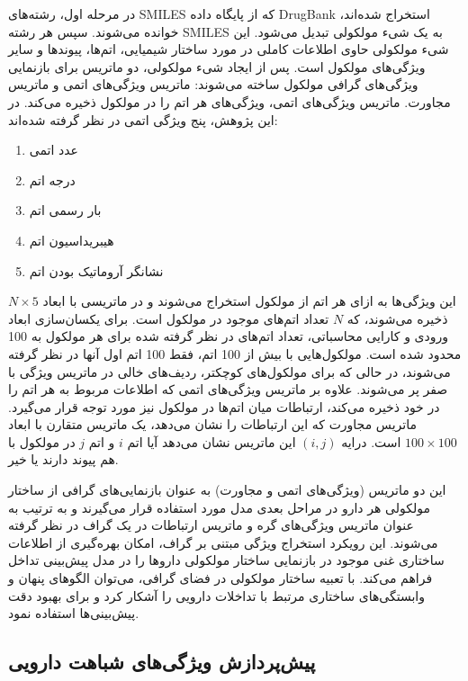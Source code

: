 در مرحله اول، رشته‌های SMILES که از پایگاه داده DrugBank استخراج شده‌اند، خوانده می‌شوند. سپس هر رشته SMILES به یک شیء مولکولی تبدیل می‌شود. این شیء مولکولی حاوی اطلاعات کاملی در مورد ساختار شیمیایی، اتم‌ها، پیوندها و سایر ویژگی‌های مولکول است. پس از ایجاد شیء مولکولی، دو ماتریس برای بازنمایی ویژگی‌های گرافی مولکول ساخته می‌شوند: ماتریس ویژگی‌های اتمی و ماتریس مجاورت. ماتریس ویژگی‌های اتمی، ویژگی‌های هر اتم را در مولکول ذخیره می‌کند. در این پژوهش، پنج ویژگی اتمی در نظر گرفته شده‌اند:

\begin{enumerate}
	\item عدد اتمی
	\item درجه اتم 
	\item بار رسمی اتم
	\item هیبریداسیون اتم
	\item نشانگر آروماتیک بودن اتم
\end{enumerate}

این ویژگی‌ها به ازای هر اتم از مولکول استخراج می‌شوند و در ماتریسی با ابعاد $N \times 5$ ذخیره می‌شوند، که $N$ تعداد اتم‌های موجود در مولکول است. برای یکسان‌سازی ابعاد ورودی و کارایی محاسباتی، تعداد اتم‌های در نظر گرفته شده برای هر مولکول به 100 محدود شده است. مولکول‌هایی با بیش از 100 اتم، فقط 100 اتم اول آنها در نظر گرفته می‌شوند، در حالی که برای مولکول‌های کوچکتر، ردیف‌های خالی در ماتریس ویژگی با صفر پر می‌شوند. علاوه بر ماتریس ویژگی‌های اتمی که اطلاعات مربوط به هر اتم را در خود ذخیره می‌کند، ارتباطات میان اتم‌ها در مولکول نیز مورد توجه قرار می‌گیرد. ماتریس مجاورت که این ارتباطات را نشان می‌دهد، یک ماتریس متقارن با ابعاد $100 \times 100$ است. درایه $(i,j)$ این ماتریس نشان می‌دهد آیا اتم $i$ و اتم $j$ در مولکول با هم پیوند دارند یا خیر.

این دو ماتریس (ویژگی‌های اتمی و مجاورت) به عنوان بازنمایی‌های گرافی از ساختار مولکولی هر دارو در مراحل بعدی مدل مورد استفاده قرار می‌گیرند و به ترتیب به عنوان ماتریس ویژگی‌های گره و ماتریس ارتباطات در یک گراف در نظر گرفته می‌شوند. این رویکرد استخراج ویژگی مبتنی بر گراف، امکان بهره‌گیری از اطلاعات ساختاری غنی موجود در بازنمایی ساختار مولکولی داروها را در مدل پیش‌بینی تداخل فراهم می‌کند. با تعبیه ساختار مولکولی در فضای گرافی، می‌توان الگوهای پنهان و وابستگی‌های ساختاری مرتبط با تداخلات دارویی را آشکار کرد و برای بهبود دقت پیش‌بینی‌ها استفاده نمود.

\subsection{پیش‌پردازش ویژگی‌های شباهت دارویی}


